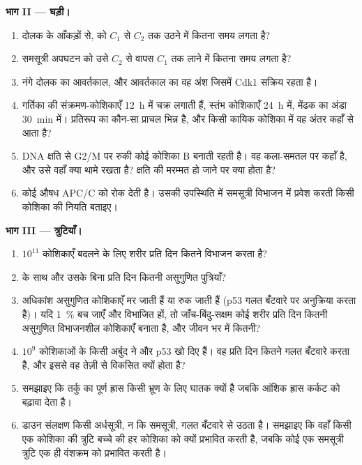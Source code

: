 \begin{problem}
\medskip
\noindent\textbf{भाग II --- घड़ी।}
\begin{enumerate}[resume]
  \item दोलक के आँकड़ों से,  को $C_{1}$ से $C_{2}$ तक उठने में
        कितना समय लगता है?
  \item समसूत्री अपघटन को उसे $C_{2}$ से वापस $C_{1}$ तक लाने में कितना
        समय लगता है?
  \item नंगे दोलक का आवर्तकाल, और आवर्तकाल का वह अंश जिसमें Cdk1
        सक्रिय रहता है।
  \item गर्तिका की संक्रमण-कोशिकाएँ \qty{12}{h} में चक्र लगाती हैं,
        स्तंभ कोशिकाएँ \qty{24}{h} में, मेंढक का अंडा
        \qty{30}{min} में। प्रतिरूप का कौन-सा प्राचल भिन्न है, और किसी
        कायिक कोशिका में वह अंतर कहाँ से आता है?
  \item DNA क्षति से G2/M  पर रुकी कोई कोशिका  B बनाती
        रहती है। वह कला-समतल पर कहाँ है, और उसे वहाँ क्या थामे रखता
        है? क्षति की मरम्मत हो जाने पर क्या होता है?
  \item कोई औषध APC/C को रोक देती है। उसकी उपस्थिति में समसूत्री विभाजन
        में प्रवेश करती किसी कोशिका की नियति बताइए।
\end{enumerate}

\medskip
\noindent\textbf{भाग III --- त्रुटियाँ।}
\begin{enumerate}[resume]
  \item $10^{11}$ कोशिकाएँ बदलने के लिए शरीर प्रति दिन कितने विभाजन
        करता है?
  \item {} के साथ और उसके बिना प्रति दिन कितनी असुगुणित
        पुत्रियाँ?
  \item अधिकांश असुगुणित कोशिकाएँ मर जाती हैं या रुक जाती हैं (p53
        गलत बँटवारे पर अनुक्रिया करता है)। यदि \qty{1}{\%} बच जाएँ और
        विभाजित हों, तो जाँच-बिंदु-सक्षम कोई शरीर प्रति दिन कितनी
        असुगुणित विभाजनशील कोशिकाएँ बनाता है, और जीवन भर में कितनी?
  \item $10^{9}$ कोशिकाओं के किसी अर्बुद ने  और p53 खो दिए
        हैं। वह प्रति दिन कितने गलत बँटवारे करता है, और इससे वह तेज़ी
        से विकसित क्यों होता है?
  \item समझाइए कि तर्कु  का पूर्ण ह्रास किसी भ्रूण के लिए
        घातक क्यों है जबकि आंशिक ह्रास कर्कट को बढ़ावा देता है।
  \item डाउन संलक्षण किसी अर्धसूत्री, न कि समसूत्री, गलत बँटवारे से
        उठता है। समझाइए कि वहाँ किसी एक कोशिका की त्रुटि बच्चे की हर
        कोशिका को क्यों प्रभावित करती है, जबकि कोई एक समसूत्री त्रुटि
        एक ही वंशक्रम को प्रभावित करती है।
\end{enumerate}


\end{problem}
